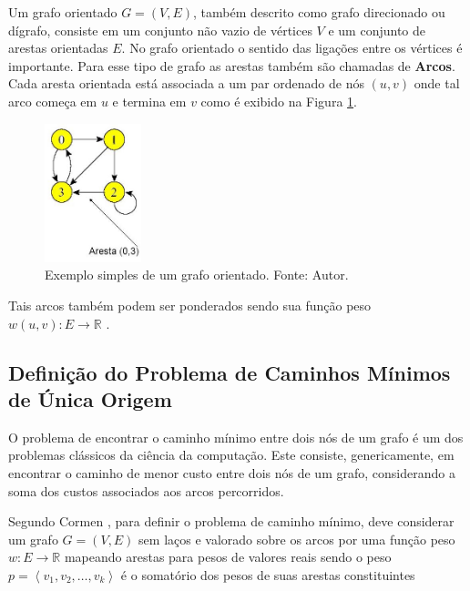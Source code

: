 \documentclass[12pt]{article}
\begin{document}
Um grafo orientado $G=(V,E)$, também descrito como grafo direcionado ou dígrafo, consiste em um conjunto não vazio de vértices $V$ e um conjunto de arestas orientadas $E$. No grafo orientado o sentido das ligações entre os vértices é importante. Para esse tipo de grafo as arestas também são chamadas de \textbf{Arcos}. Cada aresta orientada está associada a um par ordenado de nós $(u, v)$ onde tal arco começa em $u$ e termina em $v$ como é exibido na Figura \ref{fig:orientado}. 

\begin{figure}[H]
  \centering
    \includegraphics[width=0.25\textwidth]{img/ponderado.jpg}
  \caption{Exemplo simples de um grafo orientado. Fonte: Autor.}
  \label{fig:orientado}
\end{figure}

Tais arcos também podem ser ponderados sendo sua função peso $w(u, v) : E \rightarrow \mathbb{R}$ \cite{netto2003grafos}.


    
\subsection{Definição do Problema de Caminhos Mínimos de Única Origem} \label{sec:1todos}

O problema de encontrar o caminho mínimo entre dois nós de um grafo é um dos problemas clássicos da ciência da computação. Este consiste, genericamente, em encontrar o caminho de menor custo entre dois nós de um grafo, considerando a soma dos custos associados aos arcos percorridos.\cite{hernandes2009problema}

	Segundo Cormen \cite{cormen2002algoritmos}, para definir o problema de caminho mínimo, deve considerar um grafo $G = (V, E)$ sem laços e valorado sobre os arcos por uma função peso $w : E \rightarrow \mathbb{R}$ mapeando arestas para pesos de valores reais sendo o peso $p = \left \langle v_{1}, v_{2}, \ldots, v_{k}  \right \rangle$ é o somatório dos pesos de suas arestas constituintes 
    
\end{document}
